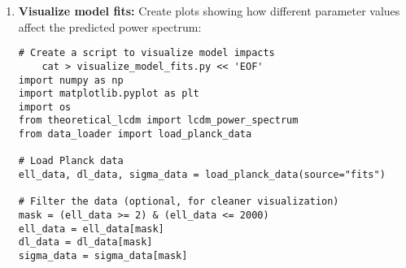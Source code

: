 \documentclass[11pt]{article}
\begin{document}
\begin{enumerate}
\begin{lstlisting}[basicstyle=\small\ttfamily]
        interpretation += "This parameter is primarily constrained by the large-scale polarization data in Planck, so our constraint from TT spectrum alone is noteworthy.\n\n"

interpretation += """
## Parameter Degeneracies

The corner plot reveals several parameter degeneracies that are well-understood in CMB physics:

1. **H0-Ωm degeneracy**: There is a degeneracy between the Hubble constant and matter density. This is because the CMB primarily constrains the acoustic scale, which depends on the combination of these parameters.

2. **ns-As degeneracy**: These parameters show some correlation as they both affect the shape and amplitude of the power spectrum.

3. **τ-As degeneracy**: Reionization optical depth and primordial amplitude are degenerate because both affect the overall amplitude of the peaks. Increasing τ suppresses power, which can be compensated by increasing As.

These degeneracies could be broken by adding additional datasets, such as BAO, supernovae, or CMB polarization.
"""

# Save interpretation to file
with open("mcmc_results/parameter_interpretation.md", "w") as f:
    f.write(interpretation)

print("Interpretation saved to mcmc_results/parameter_interpretation.md")
print("Planck comparison plot saved to mcmc_results/planck_comparison.png")
EOF

    # Run the comparison script
    python3 compare_with_planck.py
    \end{lstlisting}
    
    \item \textbf{Visualize model fits:} Create plots showing how different parameter values affect the predicted power spectrum:
    \begin{lstlisting}[basicstyle=\small\ttfamily]
    # Create a script to visualize model impacts
    cat > visualize_model_fits.py << 'EOF'
import numpy as np
import matplotlib.pyplot as plt
import os
from theoretical_lcdm import lcdm_power_spectrum
from data_loader import load_planck_data

# Load Planck data
ell_data, dl_data, sigma_data = load_planck_data(source="fits")

# Filter the data (optional, for cleaner visualization)
mask = (ell_data >= 2) & (ell_data <= 2000)
ell_data = ell_data[mask]
dl_data = dl_data[mask]
sigma_data = sigma_data[mask]


\end{lstlisting}
\end{enumerate}
\end{document}
